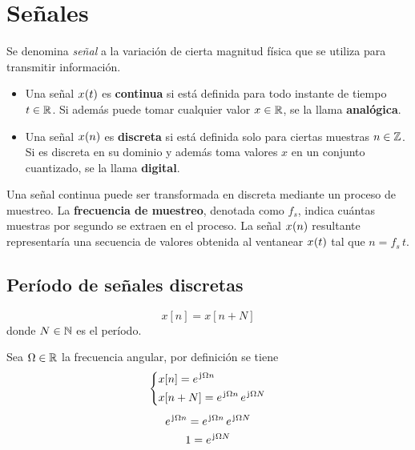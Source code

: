 \chapter{Señales}

Se denomina \emph{señal} a la variación de cierta magnitud física que se utiliza para transmitir información.

\begin{itemize}
    \item
    Una señal $\fx[x]{t}$ es \textbf{continua} si está definida para todo instante de tiempo $t \in \setR$.
    Si además puede tomar cualquier valor $x \in \setR$, se la llama \textbf{analógica}.

    \item
    Una señal $\fx[x]{n}$ es \textbf{discreta} si está definida solo para ciertas muestras $n \in \setZ$.
    Si es discreta en su dominio y además toma valores $x$ en un conjunto cuantizado, se la llama \textbf{digital}.
\end{itemize}

Una señal continua puede ser transformada en discreta mediante un proceso de muestreo.
La \textbf{frecuencia de muestreo}, denotada como $f_s$, indica cuántas muestras por segundo se extraen en el proceso.
La señal $\fx[x]{n}$ resultante representaría una secuencia de valores obtenida al ventanear $\fx[x]{t}$ tal que $n = f_s \, t$.

\section{Período de señales discretas}

\begin{mdframed}[style=DefinitionFrame]
    \begin{defn}
        \label{defn:funcDiscPeriod}
    \end{defn}
    \begin{equation*}
        x[n] = x[n+N]
    \end{equation*}
    donde $N \in \setN$ es el período.
\end{mdframed}

Sea $\Omega \in \setR$ la frecuencia angular, por definición se tiene
\begin{gather*}
    \left\{
    \begin{aligned}
        & x[n] = e^{\iu \Omega n}
        \\
        & x[n+N] = e^{\iu \Omega n} \, e^{\iu \Omega N}
    \end{aligned}
    \right.
    \\[1ex]
    e^{\iu \Omega n} = e^{\iu \Omega n} \, e^{\iu \Omega N}
    \\
    1 = e^{\iu \Omega N}
\end{gather*}

